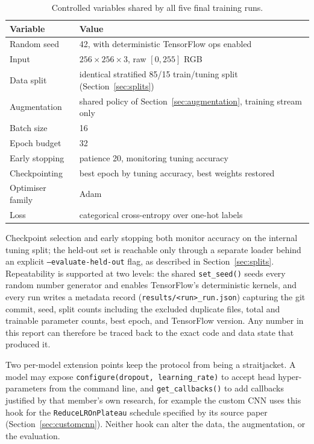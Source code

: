 \documentclass[11pt,twoside,a4paper]{article}
\begin{document}
\begin{table}[H]
\centering
\caption{Controlled variables shared by all five final training runs.}
\label{tab:protocol}
\small
\begin{tabular}{ll}
\toprule
Variable & Value \\
\midrule
Random seed & 42, with deterministic TensorFlow ops enabled \\
Input & $256 \times 256 \times 3$, raw $[0,255]$ RGB \\
Data split & identical stratified 85/15 train/tuning split (Section~\ref{sec:splits}) \\
Augmentation & shared policy of Section~\ref{sec:augmentation}, training stream only \\
Batch size & 16 \\
Epoch budget & 32 \\
Early stopping & patience 20, monitoring tuning accuracy \\
Checkpointing & best epoch by tuning accuracy, best weights restored \\
Optimiser family & Adam \\
Loss & categorical cross-entropy over one-hot labels \\
\bottomrule
\end{tabular}
\end{table}

Checkpoint selection and early stopping both monitor accuracy on the internal
tuning split; the held-out set is reachable only through a separate loader
behind an explicit \texttt{--evaluate-held-out} flag, as described in
Section~\ref{sec:splits}. Repeatability is supported at two levels: the
shared \texttt{set\_seed()} seeds every random number generator and enables
TensorFlow's deterministic kernels, and every run writes a metadata record
(\texttt{results/<run>\_run.json}) capturing the git commit, seed, split
counts including the excluded duplicate files, total and trainable parameter
counts, best epoch, and TensorFlow version. Any number in this report can
therefore be traced back to the exact code and data state that produced it.

Two per-model extension points keep the protocol from being a straitjacket.
A model may expose \texttt{configure(dropout, learning\_rate)} to accept
head hyper-parameters from the command line, and \texttt{get\_callbacks()} to
add callbacks justified by that member's own research, for example the custom CNN uses
this hook for the \texttt{ReduceLROnPlateau} schedule specified by its source
paper (Section~\ref{sec:customcnn}). Neither hook can alter the data, the
augmentation, or the evaluation.
\end{document}
